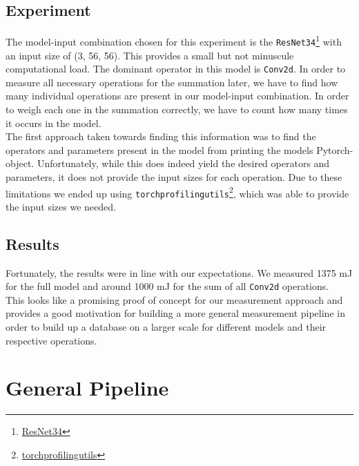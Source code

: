 \documentclass[conference]{IEEEtran}
\begin{document}
\subsection{Experiment}
The model-input combination chosen for this experiment is the \texttt{ResNet34}\footnote{\href{https://pytorch.org/vision/main/models/generated/torchvision.models.resnet34.html}{ResNet34}} with an input size of (3, 56, 56). This provides a small but not minuscule computational load. The dominant operator in this model is \texttt{Conv2d}. In order to measure all necessary operations for the summation later, we have to find how many individual operations are present in our model-input combination. In order to weigh each one in the summation correctly, we have to count how many times it occurs in the model.  \\
The first approach taken towards finding this information was to find the operators and parameters present in the model from printing the models Pytorch-object. Unfortunately, while this does indeed yield the desired operators and parameters, it does not provide the input sizes for each operation. Due to these limitations we ended up using \texttt{torchprofilingutils}\footnote{\href{https://github.com/UniHD-CEG/torchprofilingutils}{torchprofilingutils}}, which was able to provide the input sizes we needed.


\subsection{Results}
Fortunately, the results were in line with our expectations. We measured 1375 mJ for the full model and around 1000 mJ for the sum of all \texttt{Conv2d} operations. \\
This looks like a promising proof of concept for our measurement approach and provides a good motivation for building a more general measurement pipeline in order to build up a database on a larger scale for different models and their respective operations. 

\section{General Pipeline}
\end{document}
